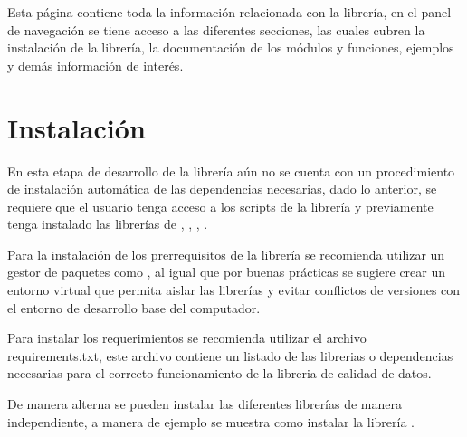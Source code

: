 \documentclass[letterpaper,10pt,openany,spanish]{sphinxmanual}
\begin{document}
Esta página contiene toda la información relacionada con la librería, en el panel de navegación se tiene acceso a las diferentes secciones, las cuales cubren la instalación de la librería, la documentación de los módulos y funciones, ejemplos y demás información de interés.


\chapter{Instalación}
\label{\detokenize{instalacion:instalacion}}\label{\detokenize{instalacion:id1}}\label{\detokenize{instalacion::doc}}
En esta etapa de desarrollo de la librería aún no se cuenta con un procedimiento de instalación automática de las dependencias necesarias, dado lo anterior, se requiere que el usuario tenga acceso a los scripts de la librería y previamente tenga instalado las librerías de , , , .

Para la instalación de los prerrequisitos de la librería se recomienda utilizar un gestor de paquetes como , al igual que por buenas prácticas se sugiere crear un entorno virtual que permita aislar las librerías y evitar conflictos de versiones con el entorno de desarrollo base del computador.

Para instalar los requerimientos se recomienda utilizar el archivo requirements.txt, este archivo contiene un listado de las librerias o dependencias necesarias para el correcto funcionamiento de la libreria de calidad de datos.
\begin{quote}

\begin{sphinxVerbatim}[commandchars=\\\{\}]
\end{sphinxVerbatim}
\end{quote}

De manera alterna se pueden instalar las diferentes librerías de manera independiente, a manera de ejemplo se muestra como instalar la librería .
\begin{quote}

\begin{sphinxVerbatim}[commandchars=\\\{\}]
\end{sphinxVerbatim}
\end{quote}
\end{document}
